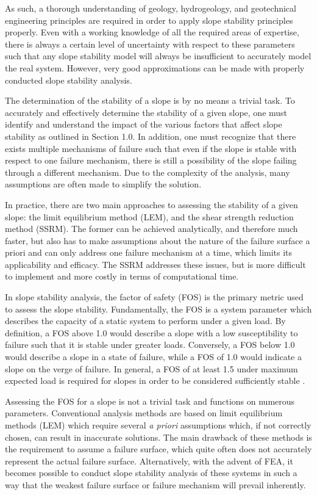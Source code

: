 As such, a thorough understanding of geology, hydrogeology, and geotechnical engineering principles are required in order to apply slope stability principles properly. Even with a working knowledge of all the required areas of expertise, there is always a certain level of uncertainty with respect to these parameters such that any slope stability model will always be insufficient to accurately model the real system. However, very good approximations can be made with properly conducted slope stability analysis.

The determination of the stability of a slope is by no means a trivial task. To accurately and effectively determine the stability of a given slope, one must identify and understand the impact of the various factors that affect slope stability as outlined in Section 1.0. In addition, one must recognize that there exists multiple mechanisms of failure such that even if the slope is stable with respect to one failure mechanism, there is still a possibility of the slope failing through a different mechanism. Due to the complexity of the analysis, many assumptions are often made to simplify the solution. 

In practice, there are two main approaches to assessing the stability of a given slope: the limit equilibrium method (LEM), and the shear strength reduction method (SSRM). The former can be achieved analytically, and therefore much faster, but also has to make assumptions about the nature of the failure surface a priori and can only address one failure mechanism at a time, which limits its applicability and efficacy. The SSRM addresses these issues, but is more difficult to implement and more costly in terms of computational time. 

In slope stability analysis, the factor of safety (FOS) is the primary metric used to assess the slope stability. Fundamentally, the FOS is a system parameter which describes the capacity of a static system to perform under a given load. By definition, a FOS above 1.0 would describe a slope with a low susceptibility to failure such that it is stable under greater loads. Conversely, a FOS below 1.0 would describe a slope in a state of failure, while a FOS of 1.0 would indicate a slope on the verge of failure. In general, a FOS of at least 1.5 under maximum expected load is required for slopes in order to be considered sufficiently stable \citep{das_principles_2009}.

Assessing the FOS for a slope is not a trivial task and functions on numerous parameters. Conventional analysis methods are based on limit equilibrium methods (LEM) which require several \textit{a priori} assumptions which, if not correctly chosen, can result in inaccurate solutions. The main drawback of these methods is the requirement to assume a failure surface, which quite often does not accurately represent the actual failure surface. Alternatively, with the advent of FEA, it becomes possible to conduct slope stability analysis of these systems in such a way that the weakest failure surface or failure mechanism will prevail inherently.

